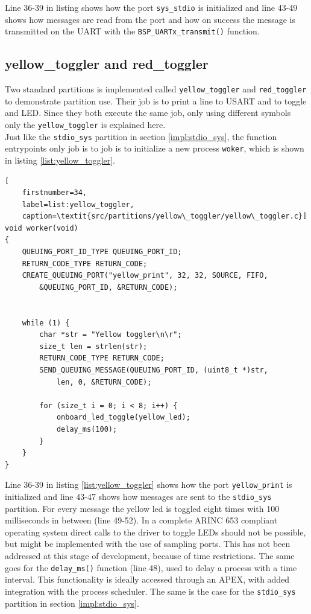 Line 36-39 in listing shows how the port \texttt{sys\_stdio} is initialized and line
43-49 shows how messages are read from the port and how on success the message
is transmitted on the UART with the \texttt{BSP\_UARTx\_transmit()} function.


\subsection{yellow\_toggler and red\_toggler}
Two standard partitions is implemented called \texttt{yellow\_toggler} and
\texttt{red\_toggler} to demonstrate partition use. Their job is to print a line
to USART and to toggle and LED. Since they both execute the same job, only using
different symbols only the \texttt{yellow\_toggler} is explained here.\\

Just like the \texttt{stdio\_sys} partition in section \ref{impl:stdio_sys}, the
function entrypoints only job is to job is to initialize a new process
\texttt{woker}, which is shown in listing \ref{list:yellow_toggler}.

\begin{minipage}{\linewidth}
\begin{lstlisting}[
	firstnumber=34,
	label=list:yellow_toggler,
	caption=\textit{src/partitions/yellow\_toggler/yellow\_toggler.c}]
void worker(void)
{
    QUEUING_PORT_ID_TYPE QUEUING_PORT_ID;
    RETURN_CODE_TYPE RETURN_CODE;
    CREATE_QUEUING_PORT("yellow_print", 32, 32, SOURCE, FIFO,
		&QUEUING_PORT_ID, &RETURN_CODE);


    while (1) {
        char *str = "Yellow toggler\n\r";
        size_t len = strlen(str);
        RETURN_CODE_TYPE RETURN_CODE;
        SEND_QUEUING_MESSAGE(QUEUING_PORT_ID, (uint8_t *)str,
			len, 0,	&RETURN_CODE);

        for (size_t i = 0; i < 8; i++) {
            onboard_led_toggle(yellow_led);
            delay_ms(100);
        }
    }
}
\end{lstlisting}
\end{minipage}

Line 36-39 in listing \ref{list:yellow_toggler} shows how the port
\texttt{yellow\_print} is initialized and line 43-47 shows how messages are sent
to the \texttt{stdio\_sys} partition. For every message the yellow led is
toggled eight times with 100 milliseconds in between (line 49-52). In a complete
ARINC 653 compliant operating system direct calls to the driver to toggle LEDs
should not be possible, but might be implemented with the use of sampling ports.
This has not been addressed at this stage of development, because of time
restrictions. The same goes for the \texttt{delay\_ms()} function (line 48),
used to delay a process with a time interval. This functionality is ideally
accessed through an APEX, with added integration with the process scheduler.
The same is the case for the \texttt{stdio\_sys} partition in section
\ref{impl:stdio_sys}.

